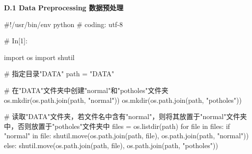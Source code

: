 \documentclass{MathorCupmodeling}
\begin{document}
\newpage

\textbf{D.1 Data Preprocessing 数据预处理}
\begin{python}
#!/usr/bin/env python
# coding: utf-8

# In[1]:


import os
import shutil

# 指定目录"DATA"
path = "DATA"

# 在"DATA"文件夹中创建"normal"和"potholes"文件夹
os.mkdir(os.path.join(path, "normal"))
os.mkdir(os.path.join(path, "potholes"))

# 读取"DATA"文件夹，若文件名中含有"normal"，则将其放置于"normal"文件夹中，否则放置于"potholes"文件夹中
files = os.listdir(path)
for file in files:
    if "normal" in file:
        shutil.move(os.path.join(path, file), os.path.join(path, "normal"))
    else:
        shutil.move(os.path.join(path, file), os.path.join(path, "potholes"))

\end{python}
\end{document}
